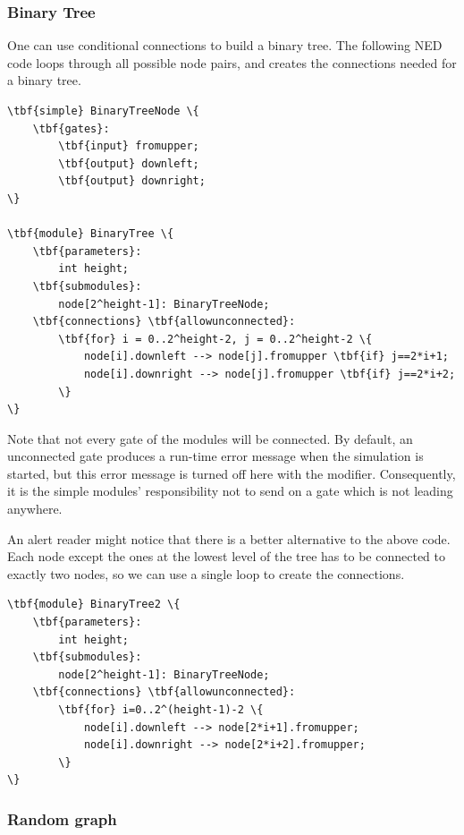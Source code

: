 \subsubsection{Binary Tree}

One can use conditional connections to build a binary tree.
The following NED code loops through all possible node pairs, and
creates the connections needed for a binary tree.

\begin{Verbatim}[commandchars=\\\{\}]
\tbf{simple} BinaryTreeNode \{
    \tbf{gates}:
        \tbf{input} fromupper;
        \tbf{output} downleft;
        \tbf{output} downright;
\}

\tbf{module} BinaryTree \{
    \tbf{parameters}:
        int height;
    \tbf{submodules}:
        node[2^height-1]: BinaryTreeNode;
    \tbf{connections} \tbf{allowunconnected}:
        \tbf{for} i = 0..2^height-2, j = 0..2^height-2 \{
            node[i].downleft --> node[j].fromupper \tbf{if} j==2*i+1;
            node[i].downright --> node[j].fromupper \tbf{if} j==2*i+2;
        \}
\}
\end{Verbatim}

Note that not every gate of the modules will be connected. By default,
an unconnected gate produces a run-time error message when the
simulation is started, but this error message is turned off here with
the  modifier.
Consequently, it is the simple modules' responsibility not to send
on a gate which is not leading anywhere.

An alert reader might notice that there is a better alternative
to the above code. Each node except the ones at the lowest level
of the tree has to be connected to exactly two nodes,
so we can use a single loop to create the connections.

\begin{Verbatim}[commandchars=\\\{\}]
\tbf{module} BinaryTree2 \{
    \tbf{parameters}:
        int height;
    \tbf{submodules}:
        node[2^height-1]: BinaryTreeNode;
    \tbf{connections} \tbf{allowunconnected}:
        \tbf{for} i=0..2^(height-1)-2 \{
            node[i].downleft --> node[2*i+1].fromupper;
            node[i].downright --> node[2*i+2].fromupper;
        \}
\}
\end{Verbatim}


\subsubsection{Random graph}

